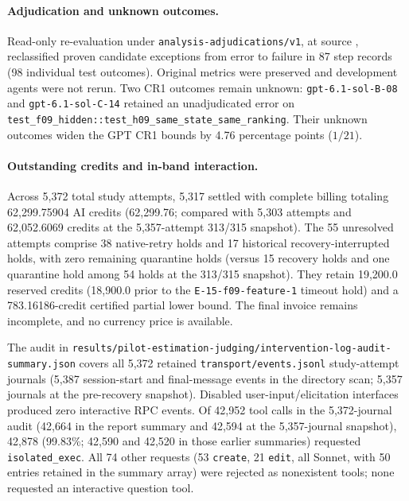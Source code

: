 \paragraph{Adjudication and unknown outcomes.}
Read-only re-evaluation under \nolinkurl{analysis-adjudications/v1}, at
source , reclassified
proven candidate exceptions from error to failure in 87 step records
(98 individual test outcomes). Original metrics were preserved and
development agents were not rerun. Two CR1 outcomes remain unknown:
\nolinkurl{gpt-6.1-sol-B-08} and \nolinkurl{gpt-6.1-sol-C-14} retained an
unadjudicated error on
\nolinkurl{test_f09_hidden::test_h09_same_state_same_ranking}.
Their unknown outcomes widen the GPT CR1 bounds by 4.76 percentage points
($1/21$).

\paragraph{Outstanding credits and in-band interaction.}
Across 5,372 total study attempts, 5,317 settled with complete billing
totaling 62,299.75904 AI credits (62,299.76; compared with 5,303 attempts
and 62,052.6069 credits at the 5,357-attempt 313/315 snapshot). The
55 unresolved attempts comprise 38 native-retry holds and 17 historical
recovery-interrupted holds, with zero remaining quarantine holds (versus
15 recovery holds and one quarantine hold among 54 holds at the 313/315
snapshot). They retain 19,200.0 reserved credits (18,900.0 prior to the
\nolinkurl{E-15-f09-feature-1} timeout hold) and a 783.16186-credit
certified partial lower bound. The final invoice remains incomplete, and no currency price is available.

The audit in
\nolinkurl{results/pilot-estimation-judging/intervention-log-audit-summary.json}
covers all 5,372 retained \nolinkurl{transport/events.jsonl} study-attempt
journals (5,387 session-start and final-message events in the directory
scan; 5,357 journals at the pre-recovery snapshot).
Disabled user-input/elicitation interfaces produced zero interactive RPC
events. Of 42,952 tool calls in the 5,372-journal audit (42,664 in the
report summary and 42,594 at the 5,357-journal snapshot), 42,878 (99.83\%;
42,590 and 42,520 in those earlier summaries) requested
\nolinkurl{isolated_exec}. All 74 other requests (53 \texttt{create},
21 \texttt{edit}, all Sonnet, with 50 entries retained in the summary array)
were rejected as nonexistent tools; none requested an interactive question tool.


